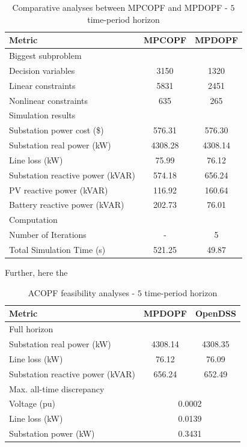 \documentclass[../../outputs/main.tex]{subfiles}
\begin{document}
\begin{table}[h!]
    \centering
    \caption{Comparative analyses between MPCOPF and MPDOPF - $5$ time-period horizon}
    \begin{tabular}{|l|c|c|}
    \hline
    \textbf{Metric} & \textbf{MPCOPF} & \textbf{MPDOPF} \\ \hline
    Biggest subproblem & \multicolumn{2}{c|}{} \\ \hline
    \quad Decision variables & {3150} & {1320} \\ \hline
    \quad Linear constraints & {5831} & {2451} \\ \hline
    \quad Nonlinear constraints & {635} & {265} \\ \hline
    Simulation results  & \multicolumn{2}{c|}{} \\ \hline
    \quad Substation power cost (\$) & 576.31 & 576.30 \\ \hline
    \quad Substation real power (kW) & 4308.28 & 4308.14 \\ \hline
    \quad Line loss (kW) & 75.99 & 76.12 \\ \hline
    \quad Substation reactive power (kVAR) & 574.18 & 656.24 \\ \hline
    \quad PV reactive power (kVAR) & 116.92 & 160.64 \\ \hline
    \quad Battery reactive power (kVAR) & 202.73 & 76.01 \\ \hline
    Computation  & \multicolumn{2}{c|}{} \\ \hline
    \quad Number of Iterations & - & 5 \\ \hline
    \quad Total Simulation Time (s) & 521.25 & 49.87 \\ \hline
    \end{tabular}
    \label{table:opt-5-20-30}
\end{table}


Further, here the 

\begin{table}[h!]
    \centering
    \caption{ACOPF feasibility analyses - $5$ time-period horizon}
    \begin{tabular}{|l|c|c|}
    \hline
    \textbf{Metric} & \textbf{MPDOPF} & \textbf{OpenDSS} \\ \hline
    Full horizon  & \multicolumn{2}{c|}{} \\ \hline
    \quad Substation real power (kW) & 4308.14 & 4308.35 \\ \hline
    \quad Line loss (kW) & 76.12 & 76.09 \\ \hline
    \quad Substation reactive power (kVAR) & 656.24 & 652.49 \\ \hline
    Max. all-time discrepancy & \multicolumn{2}{c|}{} \\ \hline
    \quad Voltage (pu) & \multicolumn{2}{c|}{0.0002} \\ \hline
    \quad Line loss (kW) & \multicolumn{2}{c|}{0.0139} \\ \hline
    \quad Substation power (kW) & \multicolumn{2}{c|}{0.3431} \\ \hline
    \end{tabular}
    \label{table:feas-5-20-30}
\end{table}
\end{document}
